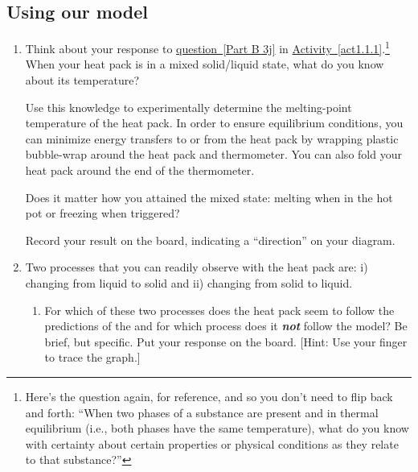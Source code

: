 \subsection{Using our model}

\begin{enumerate}
	\item Think about your response to \hyperref[Part B 3j]{question~\ref*{Part B 3j}} in \hyperref[act1.1.1]{Activity~\ref*{act1.1.1}}.\footnote{Here's the question again, for reference, and so you don't need to flip back and forth: ``When two phases of a substance are present and in thermal equilibrium (i.e., both phases have the same temperature), what do you know with certainty about certain properties or physical conditions as they relate to that substance?''} When your heat pack is in a mixed solid/liquid state, what do you know about its temperature?
	
		Use this knowledge to experimentally determine the melting-point temperature of the heat pack. In order to ensure equilibrium conditions, you can minimize energy transfers to or from the heat pack by wrapping plastic bubble-wrap around the heat pack and thermometer. You can also fold your heat pack around the end of the thermometer.
		
		Does it matter how you attained the mixed state: melting when in the hot pot or freezing when triggered?
		
		Record your result on the board, indicating a ``direction'' on your diagram.
	
	
	\item Two processes that you can readily observe with the heat pack are: i) changing from liquid to solid and ii) changing from solid to liquid.
	\begin{enumerate}
		\item For which of these two processes does the heat pack seem to follow the predictions of the {\bfseries \ThreePhaseModel{}} and for which process does it \textbf{\em not} follow the model? Be brief, but specific. Put your response on the board. [Hint: Use your finger to trace the graph.]
		

\end{enumerate}
\end{enumerate}
